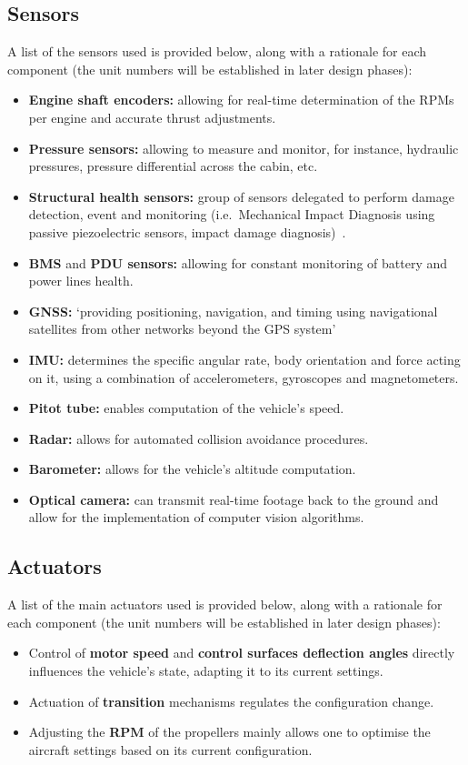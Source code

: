 \subsection{Sensors}
A list of the sensors used is provided below, along with a rationale for each component (the unit numbers will be established in later design phases):
\begin{itemize}
    \item \textbf{Engine shaft encoders:} allowing for real-time determination of the RPMs per engine and accurate thrust adjustments.
    \item \textbf{Pressure sensors:} allowing to measure and monitor, for instance, hydraulic pressures, pressure differential across the cabin, etc.
    \item \textbf{Structural health sensors:} group of sensors delegated to perform damage detection, event and monitoring (i.e.\ Mechanical Impact Diagnosis using passive piezoelectric sensors, impact damage diagnosis)~\cite{hwdiagHEALTH}.
    \item \textbf{BMS} and \textbf{PDU sensors:} allowing for constant monitoring of battery and power lines health.
    \item \textbf{GNSS:} \enquote*{providing positioning, navigation, and timing using navigational satellites from other networks beyond the GPS system} \cite{gpsgov}
    \item \textbf{IMU:} determines the specific angular rate, body orientation and force acting on it, using a combination of accelerometers, gyroscopes and magnetometers.
    \item \textbf{Pitot tube:} enables computation of the vehicle’s speed.
    \item \textbf{Radar:} allows for automated collision avoidance procedures.
    \item \textbf{Barometer:} allows for the vehicle’s altitude computation.
    \item \textbf{Optical camera:} can transmit real-time footage back to the ground and allow for the implementation of computer vision algorithms.
\end{itemize}

\subsection{Actuators}
A list of the main actuators used is provided below, along with a rationale for each component (the unit numbers will be established in later design phases):
\begin{itemize}
    \item Control of \textbf{motor speed} and \textbf{control surfaces deflection angles} directly influences the vehicle’s state, adapting it to its current settings.
    \item Actuation of \textbf{transition} mechanisms regulates the configuration change.
    \item Adjusting the \textbf{RPM} of the propellers mainly allows one to optimise the aircraft settings based on its current configuration.
\end{itemize}


